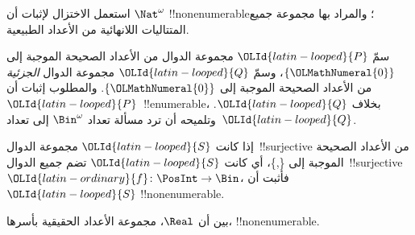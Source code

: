 \documentclass[../../../include/open-logic-section]{subfiles}
\begin{document}
\begin{prob}
استعمل الاختزال لإثبات أن $\Nat^\omega$ !!{nonenumerable}؛ والمراد بها مجموعة جميع المتتاليات اللانهائية من الأعداد الطبيعية.
\end{prob}

\begin{prob}
سمّ $\OLId{latin-looped}{P}$ مجموعة الدوال من الأعداد الصحيحة الموجبة إلى $\{\OLMathNumeral{0}\}$، وسمّ $\OLId{latin-looped}{Q}$ مجموعة الدوال \emph{الجزئية} من الأعداد الصحيحة الموجبة إلى $\{\OLMathNumeral{0}\}$. والمطلوب إثبات أن $\OLId{latin-looped}{P}$~!!{enumerable}، بخلاف $\OLId{latin-looped}{Q}$. وتلميحه أن ترد مسألة تعداد $\Bin^\omega$ إلى تعداد~$\OLId{latin-looped}{Q}$.
\end{prob}

\begin{prob}
إذا كانت $\OLId{latin-looped}{S}$ مجموعة الدوال~!!{surjective} من الأعداد الصحيحة الموجبة إلى \{,\}، أي كانت $\OLId{latin-looped}{S}$ تضم جميع الدوال~!!{surjective}~$\OLId{latin-ordinary}{f}\colon \PosInt \to \Bin$، فأثبت أن $\OLId{latin-looped}{S}$ !!{nonenumerable}.
\end{prob}

\begin{prob}
بين أن $\Real$، مجموعة الأعداد الحقيقية بأسرها، !!{nonenumerable}.
\end{prob}
\end{document}
